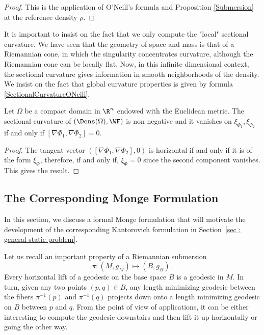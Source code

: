 \begin{proof}
This is the application of O'Neill's formula \cite[Corollary 6.2]{Lang1999} and Proposition \ref{Submersion} at the reference density $\rho$.
\end{proof}

\begin{remark}
 It is important to insist on the fact that we only compute the "local" sectional curvature. We have seen that the geometry of space and mass is that of a Riemannian cone, in which the singularity concentrates curvature, although the Riemannian cone can be locally flat. Now, in this infinite dimensional context, the sectional curvature gives information in smooth neighborhoods of the density. %
We insist on the fact that global curvature properties is given by formula \eqref{SectionalCurvatureONeill}.
 \end{remark}


\begin{corollary}
Let $\Omega$ be a compact domain in $\R^n$ endowed with the Euclidean metric.
The sectional curvature of $(\Dens(\Omega),\WF)$ is non negative and it vanishes on $\xi_{\Phi_1},\xi_{\Phi_2}$ if and only if $ [\nabla \Phi_1,\nabla \Phi_2]=0$.
\end{corollary}

\begin{proof}
The tangent vector $\left( [\nabla \Phi_1,\nabla \Phi_2] ,0 \right)$ is horizontal if and only if it is of the form $\xi_\Phi$, therefore, if and only if, $\xi_\Phi =0$ since the second component vanishes. This gives the result.
\end{proof}
\subsection{The Corresponding Monge Formulation} \label{Monge}

In this section, we discuss a formal Monge formulation that will motivate the development of the corresponding Kantorovich formulation in Section~\ref{sec : general static problem}.
 
Let us recall an important property of a Riemannian submersion $$\pi: (M,g_M) \mapsto (B,g_B)\,.$$ Every horizontal lift of a geodesic on the base space $B$ is a geodesic in $M$. In turn, given any two points $(p,q) \in B$, any length minimizing geodesic between the fibers $\pi^{-1}(p)$ and $\pi^{-1}(q)$ projects down onto a length minimizing geodesic on $B$ between $p$ and $q$. From the point of view of applications, it can be either interesting to compute the geodesic downstairs and then lift it up horizontally or going the other way.

